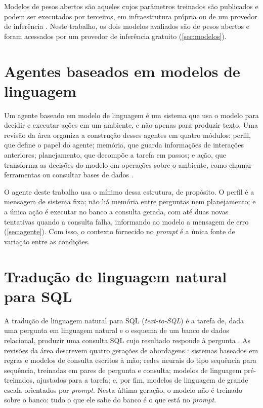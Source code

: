 Modelos de pesos abertos são aqueles cujos parâmetros treinados são
publicados e podem ser executados por terceiros, em infraestrutura
própria ou de um provedor de inferência \cite{openai2025gptoss}. Neste
trabalho, os dois modelos avaliados são de pesos abertos e foram acessados
por um provedor de inferência gratuito (\autoref{sec:modelos}).

\section{Agentes baseados em modelos de linguagem}
\label{sec:agentes}

Um agente baseado em modelo de linguagem é um sistema que usa o modelo
para decidir e executar ações em um ambiente, e não apenas para produzir
texto. Uma revisão da área organiza a construção desses agentes em quatro
módulos: perfil, que define o papel do agente; memória, que guarda
informações de interações anteriores; planejamento, que decompõe a tarefa
em passos; e ação, que transforma as decisões do modelo em operações sobre
o ambiente, como chamar ferramentas ou consultar bases de dados
\cite{wang2024agents}.

O agente deste trabalho usa o mínimo dessa estrutura, de propósito. O
perfil é a mensagem de sistema fixa; não há memória entre perguntas nem
planejamento; e a única ação é executar no banco a consulta gerada, com
até duas novas tentativas quando a consulta falha, informando ao modelo a
mensagem de erro (\autoref{sec:agente}). Com isso, o contexto fornecido no
\textit{prompt} é a única fonte de variação entre as condições.

\section{Tradução de linguagem natural para SQL}
\label{sec:text2sql}

A tradução de linguagem natural para SQL (\textit{text-to-SQL}) é a tarefa
de, dada uma pergunta em linguagem natural e o esquema de um banco de dados
relacional, produzir uma consulta SQL cujo resultado responde à pergunta
\cite{hong2024survey}. As revisões da área descrevem quatro gerações de
abordagens \cite{hong2024survey,shi2024survey,liu2025survey}: sistemas
baseados em regras e modelos de consulta escritos à mão; redes neurais do
tipo sequência para sequência, treinadas em pares de pergunta e consulta;
modelos de linguagem pré-treinados, ajustados para a tarefa; e, por fim,
modelos de linguagem de grande escala orientados por \textit{prompt}. Nesta
última geração, o modelo não é treinado sobre o banco: tudo o que ele sabe
do banco é o que está no \textit{prompt}.

